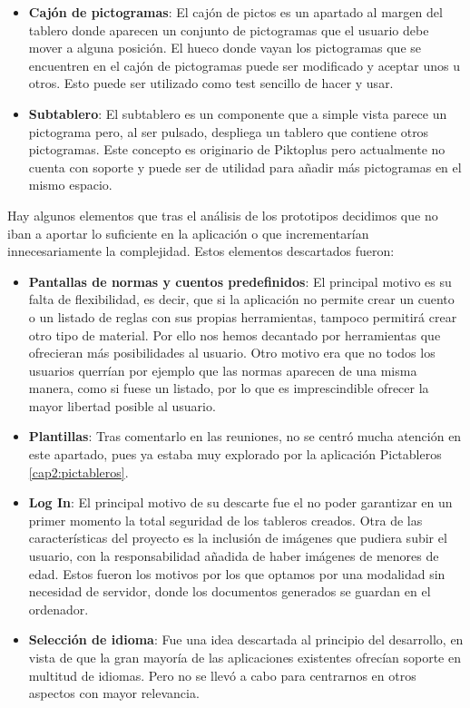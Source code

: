 \begin{itemize}
	\item \textbf{Cajón de pictogramas}: El cajón de pictos es un apartado al margen del tablero donde aparecen un conjunto de pictogramas que el usuario debe mover a alguna posición. El hueco donde vayan los pictogramas que se encuentren en el cajón de pictogramas puede ser modificado y aceptar unos u otros. Esto puede ser utilizado como test sencillo de hacer y usar.
	
	\item \textbf{Subtablero}: El subtablero es un componente que a simple vista parece un pictograma pero, al ser pulsado, despliega un tablero que contiene otros pictogramas. Este concepto es originario de Piktoplus pero actualmente no cuenta con soporte y puede ser de utilidad para añadir más pictogramas en el mismo espacio.
\end{itemize}

Hay algunos elementos que tras el análisis de los prototipos decidimos que no iban a aportar lo suficiente en la aplicación o que incrementarían innecesariamente la complejidad. Estos elementos descartados fueron:

\begin{itemize}
	\item\textbf{Pantallas de normas y cuentos predefinidos}: El principal motivo es su falta de flexibilidad, es decir, que si la aplicación no permite crear un cuento o un listado de reglas con sus propias herramientas, tampoco permitirá crear otro tipo de material. Por ello nos hemos decantado por herramientas que ofrecieran más posibilidades al usuario. Otro motivo era que no todos los usuarios querrían por ejemplo que las normas aparecen de una misma manera, como si fuese un listado, por lo que es imprescindible ofrecer la mayor libertad posible al usuario.
	
	\item \textbf{Plantillas}: Tras comentarlo en las reuniones, no se centró mucha atención en este apartado, pues ya estaba muy explorado por la aplicación Pictableros \ref{cap2:pictableros}.
	
	\item \textbf{Log In}: El principal motivo de su descarte fue el no poder garantizar en un primer momento la total seguridad de los tableros creados.
	Otra de las características del proyecto es la inclusión de imágenes que pudiera subir el usuario, con la responsabilidad añadida de haber imágenes de menores de edad. Estos fueron los motivos por los que optamos por una modalidad sin necesidad de servidor, donde los documentos generados se guardan en el ordenador.
	
	\item \textbf{Selección de idioma}: Fue una idea descartada al principio del desarrollo, en vista de que la gran mayoría de las aplicaciones existentes ofrecían soporte en multitud de idiomas. Pero no se llevó a cabo para centrarnos en otros aspectos con mayor relevancia.
	
\end{itemize}






